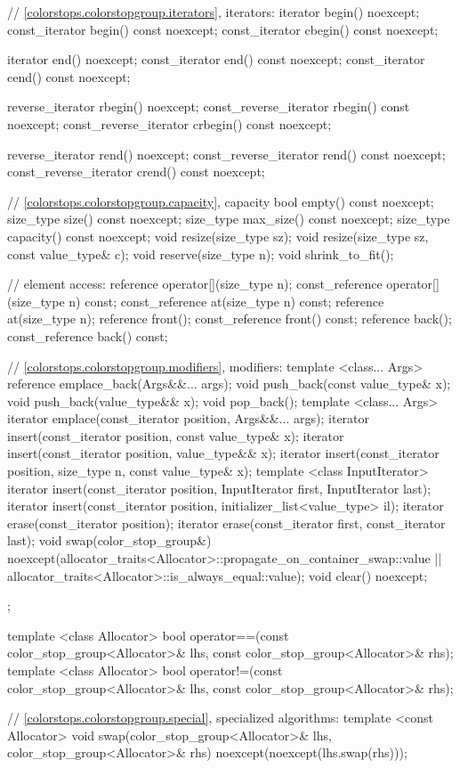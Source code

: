 \begin{codeblock}
{{{{{    // \ref{colorstops.colorstopgroup.iterators}, iterators:
    iterator begin() noexcept;
    const_iterator begin() const noexcept;
    const_iterator cbegin() const noexcept;
    
    iterator end() noexcept;
    const_iterator end() const noexcept;
    const_iterator cend() const noexcept;
    
    reverse_iterator rbegin() noexcept;
    const_reverse_iterator rbegin() const noexcept;
    const_reverse_iterator crbegin() const noexcept;
    
    reverse_iterator rend() noexcept;
    const_reverse_iterator rend() const noexcept;
    const_reverse_iterator crend() const noexcept;
    
    // \ref{colorstops.colorstopgroup.capacity}, capacity
    bool empty() const noexcept;
    size_type size() const noexcept;
    size_type max_size() const noexcept;
    size_type capacity() const noexcept;
    void resize(size_type sz);
    void resize(size_type sz, const value_type& c);
    void reserve(size_type n);
    void shrink_to_fit();
    
    // element access:
    reference operator[](size_type n);
    const_reference operator[](size_type n) const;
    const_reference at(size_type n) const;
    reference at(size_type n);
    reference front();
    const_reference front() const;
    reference back();
    const_reference back() const;
    
    // \ref{colorstops.colorstopgroup.modifiers}, modifiers:
    template <class... Args>
    reference emplace_back(Args&&... args);
    void push_back(const value_type& x);
    void push_back(value_type&& x);
    void pop_back();
    template <class... Args>
    iterator emplace(const_iterator position, Args&&... args);
    iterator insert(const_iterator position, const value_type& x);
    iterator insert(const_iterator position, value_type&& x);
    iterator insert(const_iterator position, size_type n, const value_type& x);
    template <class InputIterator>
    iterator insert(const_iterator position, InputIterator first,
      InputIterator last);
    iterator insert(const_iterator position,
    initializer_list<value_type> il);
    iterator erase(const_iterator position);
    iterator erase(const_iterator first, const_iterator last);
    void swap(color_stop_group&)
      noexcept(allocator_traits<Allocator>::propagate_on_container_swap::value 
      || allocator_traits<Allocator>::is_always_equal::value);
    void clear() noexcept;
  };

  template <class Allocator>
  bool operator==(const color_stop_group<Allocator>& lhs, 
    const color_stop_group<Allocator>& rhs);
  template <class Allocator>
  bool operator!=(const color_stop_group<Allocator>& lhs, 
    const color_stop_group<Allocator>& rhs);
  
  // \ref{colorstops.colorstopgroup.special}, specialized algorithms:
  template <const Allocator>
  void swap(color_stop_group<Allocator>& lhs, color_stop_group<Allocator>& rhs)
    noexcept(noexcept(lhs.swap(rhs)));
} } } }
\end{codeblock}

